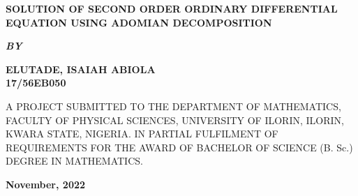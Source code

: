 \documentclass[11pt]{report}
\newcommand{\bt}[1]{\textbf{#1}}
\begin{document}
	
	\clearpage
	\thispagestyle{empty}
	\begin{center}
		\Large \bt{SOLUTION OF SECOND ORDER ORDINARY DIFFERENTIAL EQUATION USING ADOMIAN DECOMPOSITION}
	\end{center}

	\hspace{7cm}
	
	\begin{center}
		\textbf{\textit{BY}}
	\end{center}
	
	\hspace{5cm}
	
	\begin{center}
		\large \textbf{ELUTADE, ISAIAH ABIOLA
			\\
			17/56EB050}
	\end{center}
	
	\hspace{9cm}
	
	\begin{center}
		A PROJECT SUBMITTED TO THE DEPARTMENT OF MATHEMATICS, FACULTY OF PHYSICAL SCIENCES, UNIVERSITY OF ILORIN, ILORIN, KWARA STATE, NIGERIA. IN PARTIAL FULFILMENT OF REQUIREMENTS FOR THE AWARD OF BACHELOR OF SCIENCE (B. Sc.) DEGREE IN MATHEMATICS.
	\end{center}

	\hspace{7cm}
	
%	
	\begin{center}
		\textbf{November, 2022}
	\end{center}

	\newpage
\end{document}
